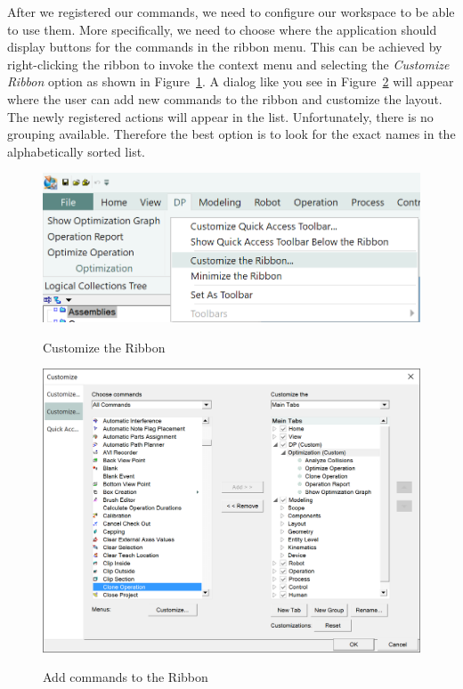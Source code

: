 After we registered our commands, we need to configure our workspace to be able to use them. 
More specifically, we need to choose where the application should display buttons for the commands in the ribbon menu. 
This can be achieved by right-clicking the ribbon to invoke the context menu and selecting the \emph{Customize Ribbon} option as shown in Figure~\ref{fig:CustomizeRibbonContextMenu}.
A dialog like you see in Figure~\ref{fig:CustomizeRibbonDialog} will appear where the user can add new commands to the ribbon and customize the layout. 
The newly registered actions will appear in the list. Unfortunately, there is no grouping available. 
Therefore the best option is to look for the exact names in the alphabetically sorted list. \\

\begin{figure}[H]
    \caption{Customize the Ribbon}
    \centering
    \includegraphics{customizeribbon}
    \label{fig:CustomizeRibbonContextMenu}
\end{figure}

\begin{figure}[H]
    \caption{Add commands to the Ribbon}
    \centering
    \includegraphics[width=\textwidth]{addcommands}
    \label{fig:CustomizeRibbonDialog}
\end{figure}

